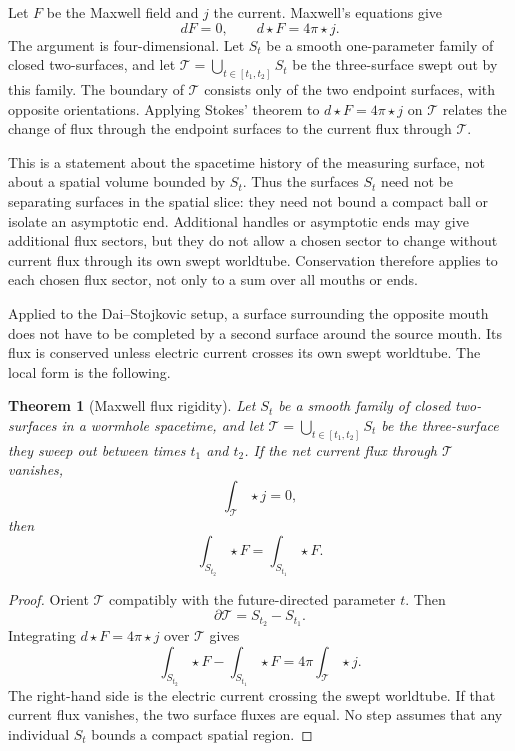 \documentclass[aps,prd,10pt,onecolumn,nofootinbib,superscriptaddress,floatfix]{revtex4-2}
\newtheorem{theorem}{Theorem}
\begin{document}
Let $F$ be the Maxwell field and $j$ the current.  Maxwell's equations give
\begin{equation}
  dF=0,\qquad d\star F=4\pi \star j.
\end{equation}
The argument is four-dimensional.  Let $S_t$ be a smooth one-parameter
family of closed two-surfaces, and let
$\mathcal T=\bigcup_{t\in[t_1,t_2]}S_t$ be the three-surface swept out by this
family.  The boundary of $\mathcal T$ consists only of the two endpoint
surfaces, with opposite orientations.  Applying Stokes' theorem to
$d\star F=4\pi\star j$ on $\mathcal T$ relates the change of flux through the
endpoint surfaces to the current flux through $\mathcal T$.

This is a statement about the spacetime history of the measuring surface, not
about a spatial volume bounded by $S_t$.  Thus the surfaces $S_t$ need not be
separating surfaces in the spatial slice: they need not bound a compact ball
or isolate an asymptotic end.  Additional handles or asymptotic ends may give
additional flux sectors, but they do not allow a chosen sector to change
without current flux through its own swept worldtube.  Conservation therefore
applies to each chosen flux sector, not only to a sum over all mouths or ends.

Applied to the Dai--Stojkovic setup, a surface surrounding the opposite mouth
does not have to be completed by a second surface around the source mouth.  Its
flux is conserved unless electric current crosses its own swept worldtube.
The local form is the following.

\begin{theorem}[Maxwell flux rigidity]
\label{thm:maxwell-flux}
Let $S_t$ be a smooth family of closed two-surfaces in a wormhole spacetime,
and let $\mathcal T=\bigcup_{t\in[t_1,t_2]}S_t$ be the three-surface they sweep
out between times $t_1$ and $t_2$.  If the net current flux through
$\mathcal T$ vanishes,
\begin{equation}
  \int_{\mathcal T}\star j=0 ,
\end{equation}
then
\begin{equation}
  \int_{S_{t_2}}\star F=\int_{S_{t_1}}\star F .
\end{equation}
\end{theorem}

\begin{proof}
Orient $\mathcal T$ compatibly with the future-directed parameter $t$.  Then
\begin{equation}
  \partial\mathcal T=S_{t_2}-S_{t_1}.
\end{equation}
Integrating $d\star F=4\pi\star j$ over $\mathcal T$ gives
\begin{equation}
  \int_{S_{t_2}}\star F-\int_{S_{t_1}}\star F
  =
  4\pi\int_{\mathcal T}\star j .
\end{equation}
The right-hand side is the electric current crossing the swept worldtube.  If
that current flux vanishes, the two surface fluxes are equal.  No step assumes
that any individual $S_t$ bounds a compact spatial region.
\end{proof}
\end{document}
